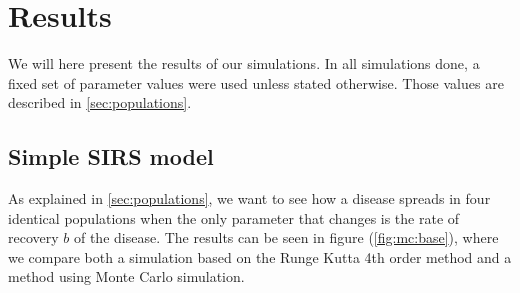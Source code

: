\documentclass[../main.tex]{subfiles}
\begin{document}
\section{Results}\label{sec:results}
We will here present the results of our simulations. In all simulations done, a fixed set of parameter values were used unless stated otherwise. Those values are described in \cref{sec:populations}.

\subsection{Simple SIRS model}
As explained in \cref{sec:populations}, we want to see how a disease spreads in four identical populations when the only parameter that changes is the rate of recovery $b$ of the disease. The results can be seen in figure (\ref{fig:mc:base}), where we compare both a simulation based on the Runge Kutta 4th order method and a method using Monte Carlo simulation. 

\end{document}

